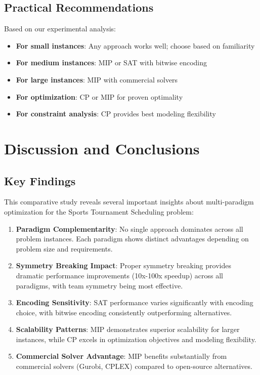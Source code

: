 \documentclass[11pt]{article}
\begin{document}
\subsection{Practical Recommendations}

Based on our experimental analysis:

\begin{itemize}
    \item \textbf{For small instances}: Any approach works well; choose based on familiarity
    \item \textbf{For medium instances}: MIP or SAT with bitwise encoding
    \item \textbf{For large instances}: MIP with commercial solvers
    \item \textbf{For optimization}: CP or MIP for proven optimality
    \item \textbf{For constraint analysis}: CP provides best modeling flexibility
\end{itemize}

\section{Discussion and Conclusions}

\subsection{Key Findings}

This comparative study reveals several important insights about multi-paradigm optimization for the Sports Tournament Scheduling problem:

\begin{enumerate}
    \item \textbf{Paradigm Complementarity}: No single approach dominates across all problem instances. Each paradigm shows distinct advantages depending on problem size and requirements.
    
    \item \textbf{Symmetry Breaking Impact}: Proper symmetry breaking provides dramatic performance improvements (10x-100x speedup) across all paradigms, with team symmetry being most effective.
    
    \item \textbf{Encoding Sensitivity}: SAT performance varies significantly with encoding choice, with bitwise encoding consistently outperforming alternatives.
    
    \item \textbf{Scalability Patterns}: MIP demonstrates superior scalability for larger instances, while CP excels in optimization objectives and modeling flexibility.
    
    \item \textbf{Commercial Solver Advantage}: MIP benefits substantially from commercial solvers (Gurobi, CPLEX) compared to open-source alternatives.
\end{enumerate}
\end{document}
